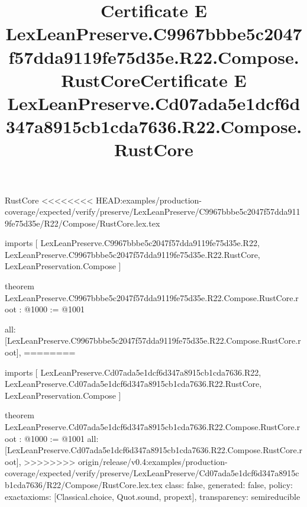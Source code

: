 \begin{lexlean}{RustCore}
<<<<<<<< HEAD:examples/production-coverage/expected/verify/preserve/LexLeanPreserve/C9967bbbe5c2047f57dda9119fe75d35e/R22/Compose/RustCore.lex.tex
\title{Certificate E LexLeanPreserve.C9967bbbe5c2047f57dda9119fe75d35e.R22.Compose.RustCore}
\begin{coremodule}
imports [
  LexLeanPreserve.C9967bbbe5c2047f57dda9119fe75d35e.R22,
  LexLeanPreserve.C9967bbbe5c2047f57dda9119fe75d35e.R22.RustCore,
  LexLeanPreservation.Compose
]

theorem LexLeanPreserve.C9967bbbe5c2047f57dda9119fe75d35e.R22.Compose.RustCore.root : @1000 := @1001 {
  all: [LexLeanPreserve.C9967bbbe5c2047f57dda9119fe75d35e.R22.Compose.RustCore.root],
========
\title{Certificate E LexLeanPreserve.Cd07ada5e1dcf6d347a8915cb1cda7636.R22.Compose.RustCore}
\begin{coremodule}
imports [
  LexLeanPreserve.Cd07ada5e1dcf6d347a8915cb1cda7636.R22,
  LexLeanPreserve.Cd07ada5e1dcf6d347a8915cb1cda7636.R22.RustCore,
  LexLeanPreservation.Compose
]

theorem LexLeanPreserve.Cd07ada5e1dcf6d347a8915cb1cda7636.R22.Compose.RustCore.root : @1000 := @1001 {
  all: [LexLeanPreserve.Cd07ada5e1dcf6d347a8915cb1cda7636.R22.Compose.RustCore.root],
>>>>>>>> origin/release/v0.4:examples/production-coverage/expected/verify/preserve/LexLeanPreserve/Cd07ada5e1dcf6d347a8915cb1cda7636/R22/Compose/RustCore.lex.tex
  class: false,
  generated: false,
  policy: exact{axioms: [Classical.choice, Quot.sound, propext]},
  transparency: semireducible
}


\end{coremodule}}
\end{coremodule}
\end{lexlean}
